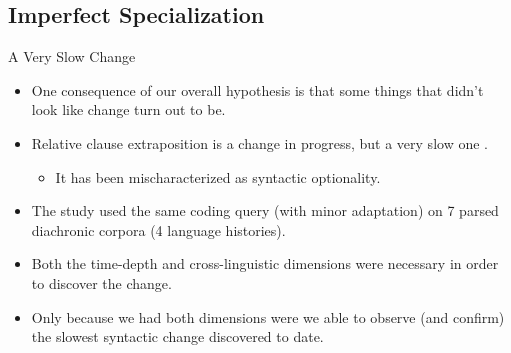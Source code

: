 \documentclass[hyperref={pdfpagelabels=false}]{beamer}
\begin{document}
\subsection{Imperfect Specialization}

\begin{frame}{A Very Slow Change}
\begin{itemize}
    \item One consequence of our overall hypothesis is that some things that didn't look like change turn out to be.
    \item Relative clause extraposition is a change in progress, but a very slow one \small{\citep[][]{wallenbergForthcoming, wallenberg2013b, fruehwaldwallenberginprep}}.
        \begin{itemize}
        \item It has been mischaracterized as syntactic optionality.
        \end{itemize}
    \item The study used the same coding query (with minor adaptation) on 7 parsed diachronic corpora (4 language histories).
    \item Both the time-depth and cross-linguistic dimensions were necessary in order to discover the change.
    \item Only because we had both dimensions were we able to observe (and confirm) the slowest syntactic change discovered to date.
    \end{itemize}
\end{frame}
\end{document}
